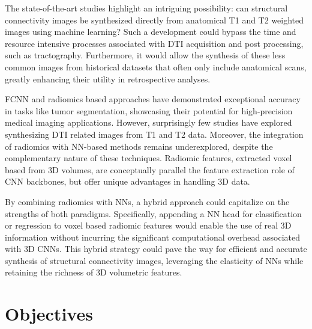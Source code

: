The state-of-the-art studies highlight an intriguing possibility: can structural connectivity images be synthesized directly from anatomical T1 and T2 weighted images using machine learning? Such a development could bypass the time and resource intensive processes associated with \ac{DTI} acquisition and post processing, such as tractography. Furthermore, it would allow the synthesis of these less common images from historical datasets that often only include anatomical scans, greatly enhancing their utility in retrospective analyses.\par
\ac{FCNN} and radiomics based approaches have demonstrated exceptional accuracy in tasks like tumor segmentation, showcasing their potential for high-precision medical imaging applications. However, surprisingly few studies have explored synthesizing \ac{DTI} related images from T1 and T2 data. Moreover, the integration of radiomics with \ac{NN}-based methods remains underexplored, despite the complementary nature of these techniques. Radiomic features, extracted voxel based from 3D volumes, are conceptually parallel the feature extraction role of \ac{CNN} backbones, but offer unique advantages in handling 3D data.\par
By combining radiomics with \ac{NN}s, a hybrid approach could capitalize on the strengths of both paradigms. Specifically, appending a \ac{NN} head for classification or regression to voxel based radiomic features would enable the use of real 3D information without incurring the significant computational overhead associated with 3D \ac{CNN}s. This hybrid strategy could pave the way for efficient and accurate synthesis of structural connectivity images, leveraging the elasticity of \ac{NN}s while retaining the richness of 3D volumetric features.

\section{Objectives}

